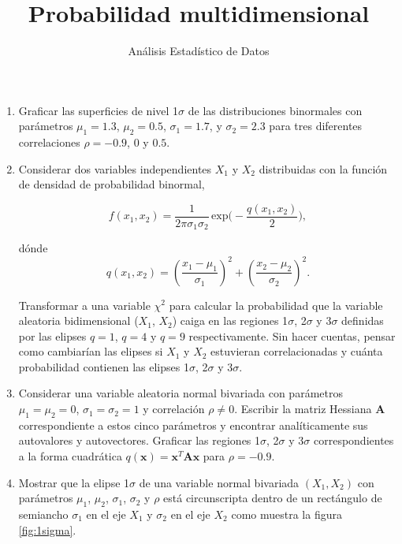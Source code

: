 \documentclass[a4paper,11pt]{article}
\title{Probabilidad multidimensional}
\author{Análisis Estadístico de Datos}
\date{}
\begin{document}
\maketitle

\begin{enumerate}


\item Graficar las superficies de nivel 1$\sigma$ de las distribuciones binormales con parámetros $\mu_1 = 1.3$, $\mu_2 = 0.5$, $\sigma_1 = 1.7$, y $\sigma_2 = 2.3$ para tres diferentes correlaciones $\rho = -0.9$, $0$ y $0.5$. 



\item Considerar dos variables independientes $X_1$ y $X_2$ distribuidas con la función de densidad de probabilidad binormal,

$$ f(x_1,x_2) = \frac{1}{2 \pi \sigma_1 \sigma_2} \, \mathrm{exp} \bigg(- \frac{q(x_1,x_2)}{2}  \bigg), $$ 

\noindent dónde $$ q(x_1,x_2) = \left(\frac{x_1-\mu_1}{\sigma_1}\right)^2  + \left(\frac{x_2-\mu_2}{\sigma_2}\right)^2 .$$ 

Transformar a una variable $\chi^2$ para calcular la probabilidad que la variable aleatoria bidimensional ($X_1$, $X_2$) caiga en las regiones 1$\sigma$, 2$\sigma$ y 3$\sigma$ definidas por las elipses $q = 1$, $q = 4$ y $q = 9$ respectivamente.
Sin hacer cuentas, pensar como cambiarían las elipses si $X_1$ y $X_2$ estuvieran correlacionadas y cuánta probabilidad contienen las elipses 1$\sigma$, 2$\sigma$ y 3$\sigma$.


\item Considerar una variable aleatoria normal bivariada con parámetros $\mu_1 = \mu_2 = 0$, $\sigma_1 = \sigma_2 = 1$ y correlación $\rho \ne 0$. Escribir la matriz Hessiana $\boldsymbol{A}$ co\-rres\-pondiente a estos cinco parámetros y encontrar analíticamente sus autovalores y autovectores. Graficar las regiones 1$\sigma$, 2$\sigma$ y 3$\sigma$ correspondientes a la forma cuadrática $q(\boldsymbol{x}) =  \boldsymbol{x}^T \boldsymbol{A} \boldsymbol{x}$  para $\rho = -0.9$.


\item Mostrar que la elipse 1$\sigma$ de una variable normal bivariada $(X_1, X_2)$ con parámetros  $\mu_1$, $\mu_2$, $\sigma_1$, $\sigma_2$ y $\rho$ está circunscripta dentro de un rectángulo de semiancho $\sigma_1$ en el eje $X_1$ y  $\sigma_2$ en el eje $X_2$ como muestra la figura \ref{fig:1sigma}.


\end{enumerate}
\end{document}
